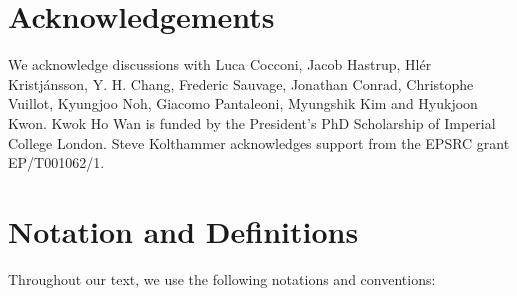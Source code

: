 \documentclass[prx,reprint,superscriptaddress,longbibliography,floatfix,nofootinbib]{revtex4-1}
\begin{document}
\section*{Acknowledgements}
We acknowledge discussions with Luca Cocconi, Jacob Hastrup, Hl\'er Kristj\'ansson, Y. H. Chang, Frederic Sauvage, Jonathan Conrad, Christophe Vuillot, Kyungjoo Noh, Giacomo Pantaleoni, Myungshik Kim and Hyukjoon Kwon. Kwok Ho Wan is funded by the President's PhD Scholarship of Imperial College London.
Steve Kolthammer acknowledges support from the EPSRC grant EP/T001062/1.



\appendix

\section{Notation and Definitions}
\label{appendix-defs}
Throughout our text, we use the following notations and conventions:
\end{document}
